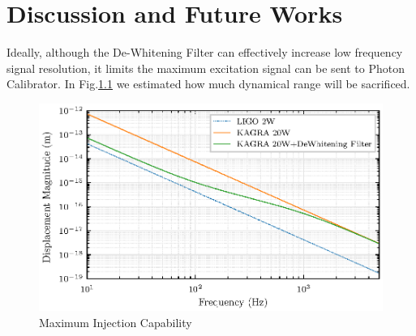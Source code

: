 




\chapter{Discussion and Future Works}

Ideally, although the De-Whitening Filter can effectively increase low frequency signal resolution, it limits the maximum excitation signal can be sent to Photon Calibrator. In Fig.\ref{fig:a} we estimated how much dynamical range will be sacrificed. 

\begin{figure}[bt]
\centering
\includegraphics[width=1\textwidth]{figure/20WdeW}
\caption{Maximum Injection Capability}\label{fig:a}
\end{figure}



